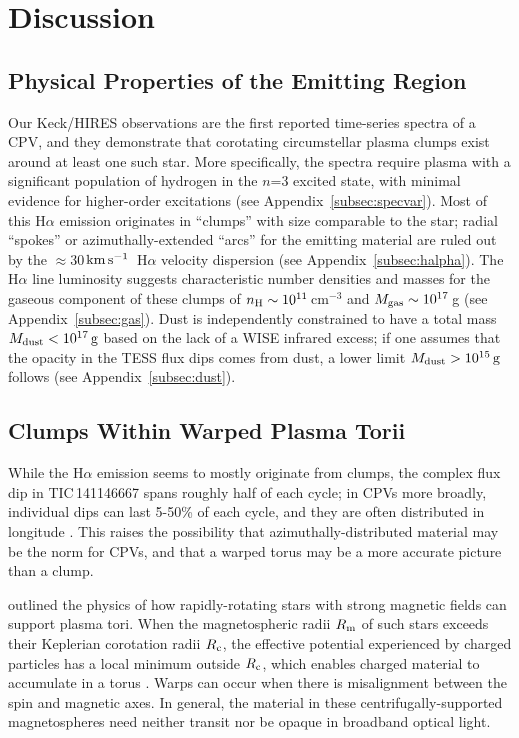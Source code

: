\documentclass[11pt,twocolumn,tighten,linenumbers]{aastex7}
\newcommand{\kms}{\ensuremath{\rm km\,s^{-1}}}
\begin{document}
\section{Discussion}
\label{sec:disc}

\subsection{Physical Properties of the Emitting Region}


Our Keck/HIRES observations are the first reported time-series spectra
of a CPV, and they demonstrate that corotating circumstellar plasma
clumps exist around at least one such star.  More specifically, the
spectra require plasma with a significant population of hydrogen in the
$n$=3 excited state, with minimal evidence for higher-order excitations
(see Appendix~\ref{subsec:specvar}).  Most of this H$\alpha$ emission
originates in ``clumps'' with size comparable to the star; radial
``spokes'' or azimuthally-extended ``arcs'' for the emitting material
are ruled out by the $\approx$30\,\kms\ H$\alpha$ velocity dispersion
(see Appendix~\ref{subsec:halpha}).  The H$\alpha$ line luminosity
suggests characteristic number densities and masses for the gaseous
component of these clumps of $n_{\rm H} \sim 10^{11}$\,cm$^{-3}$ and
$M_{\rm gas} \sim 10^{17}$\,g (see Appendix~\ref{subsec:gas}).  Dust is
independently constrained to have a total mass $M_{\rm dust} <
10^{17}\,{\rm g}$ based on the lack of a WISE infrared excess; if one
assumes that the opacity in the TESS flux dips comes from dust, a lower
limit $M_{\rm dust} > 10^{15}\,{\rm g}$ follows (see
Appendix~\ref{subsec:dust}).  


\subsection{Clumps Within Warped Plasma Torii}

While the H$\alpha$ emission seems to mostly originate from clumps, the
complex flux dip in TIC\,141146667 spans roughly half of each cycle; in
CPVs more broadly, individual dips can last 5-50\% of each cycle, and
they are often distributed in longitude \citep{Bouma2024}.  This raises
the possibility that azimuthally-distributed material may be the norm
for CPVs, and that a warped torus may be a more accurate picture than a
clump.

\citet{Townsend2005} outlined the physics of how rapidly-rotating stars
with strong magnetic fields can support plasma tori.  When the
magnetospheric radii $R_{\rm m}$ of such stars exceeds their Keplerian
corotation radii $R_{\rm c}$, the effective potential experienced by
charged particles has a local minimum outside $R_{\rm c}$, which enables
charged material to accumulate in a torus
\citep{Petit2013,Daley-Yates2024}.  Warps can occur when there is
misalignment between the spin and magnetic axes.  In general, the
material in these centrifugally-supported magnetospheres need neither
transit nor be opaque in broadband optical light.  
\end{document}
